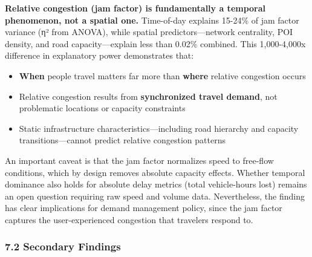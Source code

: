 \textbf{Relative congestion (jam factor) is fundamentally a temporal phenomenon, not a spatial one.} Time-of-day explains 15-24\% of jam factor variance (η² from ANOVA), while spatial predictors---network centrality, POI density, and road capacity---explain less than 0.02\% combined. This 1,000-4,000x difference in explanatory power demonstrates that:

\begin{itemize}
\tightlist
\item
  \textbf{When} people travel matters far more than \textbf{where} relative congestion occurs
\item
  Relative congestion results from \textbf{synchronized travel demand}, not problematic locations or capacity constraints
\item
  Static infrastructure characteristics---including road hierarchy and capacity transitions---cannot predict relative congestion patterns
\end{itemize}

An important caveat is that the jam factor normalizes speed to free-flow conditions, which by design removes absolute capacity effects. Whether temporal dominance also holds for absolute delay metrics (total vehicle-hours lost) remains an open question requiring raw speed and volume data. Nevertheless, the finding has clear implications for demand management policy, since the jam factor captures the user-experienced congestion that travelers respond to.

\subsubsection{7.2 Secondary Findings}\label{secondary-findings}


